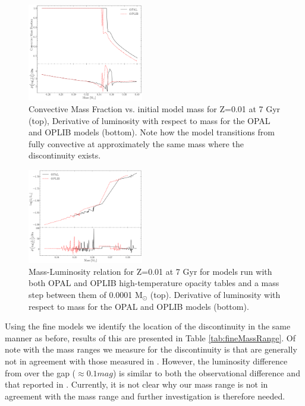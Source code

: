 \begin{figure}
	\centering
	\vspace{5mm}
	\includegraphics[width=0.45\textwidth]{src/figures/ConvectiveMassFraction.pdf}
	\caption{Convective Mass Fraction vs. initial model mass for Z=0.01 at 7
	Gyr (top), Derivative of luminosity with respect to mass for the OPAL and
	OPLIB models (bottom).  Note how the model transitions from fully
	convective at approximately the same mass where the discontinuity exists.}
	\label{fig:convTransition}
\end{figure}


\begin{figure}
	\centering
	\vspace{5mm}
	\includegraphics[width=0.45\textwidth]{src/figures/MassLumDisconZ001Paper-fine.pdf}
	\caption{Mass-Luminosity relation for Z=0.01 at 7 Gyr for models run with
	both OPAL and OPLIB high-temperature opacity tables and a mass step between
	them of 0.0001 M$_{\odot}$ (top). Derivative of luminosity with respect to
	mass for the OPAL and OPLIB models (bottom).}
	\label{fig:fineMassLum}
\end{figure}

Using the fine models we identify the location of the discontinuity in the same
manner as before, results of this are presented in Table
\ref{tab:fineMassRange}. Of note with the mass ranges we measure for the
discontinuity is that are generally not in agreement with those measured in
\citet{Mansfield2021}. However, the luminosity difference from over the gap
($\approx 0.1 mag$) is similar to both the observational difference and that
reported in \citet{Mansfield2021}. Currently, it is not clear why our mass
range is not in agreement with the \citet{Mansfield2021} mass range and further
investigation is therefore needed.
